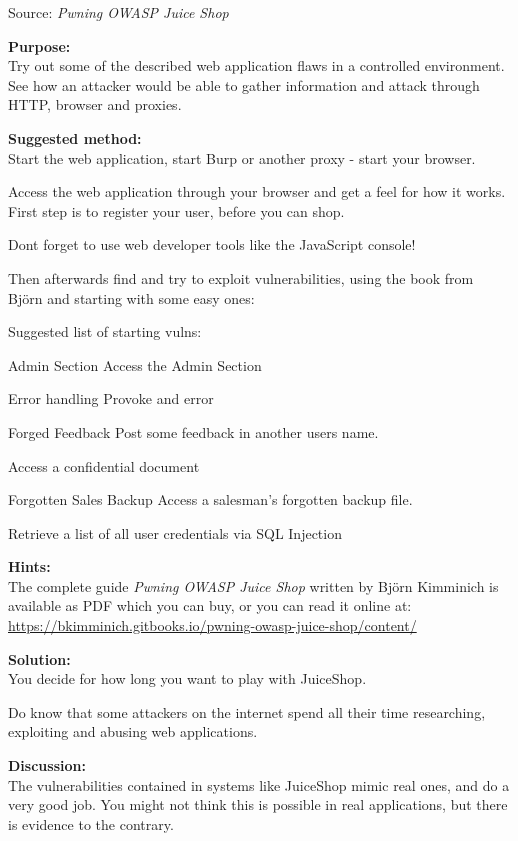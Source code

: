 \documentclass[a4paper,11pt,notitlepage]{report}
\begin{document}
Source: \emph{Pwning OWASP Juice Shop}


 {\bf Purpose:}\\
 Try out some of the described web application flaws in a controlled environment. See how an attacker would be able to gather information and attack through HTTP, browser and proxies.

 {\bf Suggested method:}\\
Start the web application, start Burp or another proxy - start your browser.

Access the web application through your browser and get a feel for how it works. First step is to register your user, before you can shop.

Dont forget to use web developer tools like the JavaScript console!

Then afterwards find and try to exploit vulnerabilities, using the book from Björn and starting with some easy ones:

Suggested list of starting vulns:
\begin{list2}
\item Admin Section Access the Admin Section
\item Error handling Provoke and error
\item Forged Feedback Post some feedback in another users name.
\item Access a confidential document
\item Forgotten Sales Backup Access a salesman's forgotten backup file.
\item Retrieve a list of all user credentials via SQL Injection
\end{list2}


 {\bf Hints:}\\
 The complete guide \emph{Pwning OWASP Juice Shop}
written by Björn Kimminich is available as PDF which you can buy, or you can read it online at:\\
\url{https://bkimminich.gitbooks.io/pwning-owasp-juice-shop/content/}

 {\bf Solution:}\\
 You decide for how long you want to play with JuiceShop.

 Do know that some attackers on the internet spend all their time researching, exploiting and abusing web applications.

 {\bf Discussion:}\\
The vulnerabilities contained in systems like JuiceShop mimic real ones, and do a very good job. You might not think this is possible in real applications, but there is evidence to the contrary.
\end{document}
